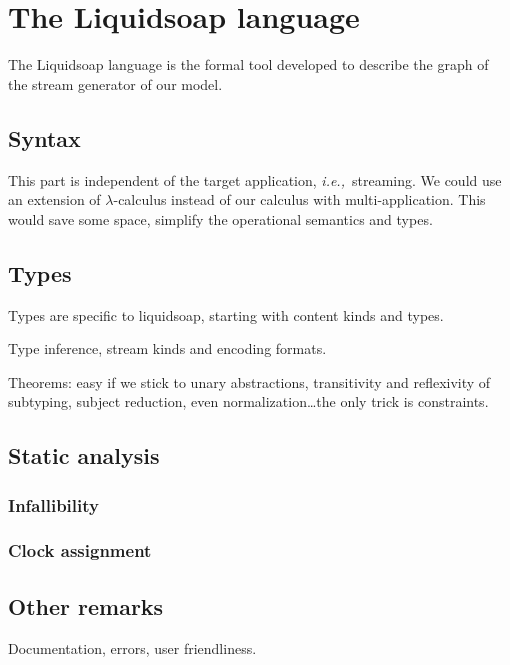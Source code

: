 \documentclass{llncs}
\newcommand{\liquidsoap}{Liquidsoap}
\newcommand{\ie}{{\em i.e.,}}
\begin{document}
\section{The \liquidsoap{} language}
\label{sec:lang}

The \liquidsoap{} language is the formal tool developed to describe the graph of the
stream generator of our model.

\subsection{Syntax}

This part is independent of the target application, \ie\ streaming.
We could use an extension of $\lambda$-calculus instead of our calculus with
multi-application. This would save some space, simplify the operational 
semantics and types.

\subsection{Types}

Types are specific to liquidsoap, starting with content kinds and types.

Type inference, stream kinds and encoding formats.

Theorems: easy if we stick to unary abstractions,
transitivity and reflexivity of subtyping, subject reduction,
even normalization\ldots the only trick is constraints.

\subsection{Static analysis}

\subsubsection{Infallibility}
\subsubsection{Clock assignment}

\subsection{Other remarks}

Documentation, errors, user friendliness.



\end{document}
